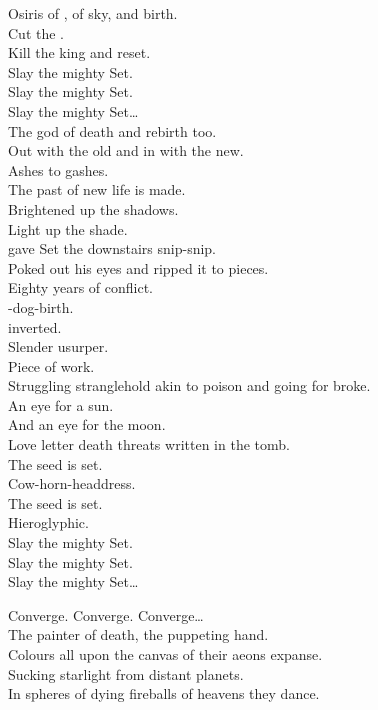Osiris of , of sky, and birth. \\
Cut the . \\
Kill the king and reset. \\

Slay the mighty Set. \\
Slay the mighty Set. \\
Slay the mighty Set… \\

The god of death and rebirth too. \\
Out with the old and in with the new. \\
Ashes to gashes. \\
The past of new life is made. \\
Brightened up the shadows. \\
Light up the shade. \\
 gave Set the downstairs snip-snip. \\
Poked out his eyes and ripped it to pieces. \\
Eighty years of conflict. \\
-dog-birth. \\
 inverted. \\
Slender usurper. \\
Piece of work. \\
Struggling stranglehold akin to poison and going for broke. \\
An eye for a sun. \\
And an eye for the moon. \\
Love letter death threats written in the tomb. \\

The seed is set. \\
Cow-horn-headdress. \\
The seed is set. \\
Hieroglyphic. \\

Slay the mighty Set. \\
Slay the mighty Set. \\
Slay the mighty Set… \\


Converge. Converge. Converge… \\

The painter of death, the puppeting hand. \\
Colours all upon the canvas of their aeons expanse. \\
Sucking starlight from distant planets. \\
In spheres of dying fireballs of heavens they dance. \\

